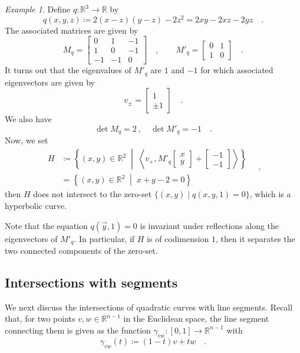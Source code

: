 \documentclass[pdftex,a4paper,12pt]{scrartcl}
\theoremstyle{plain}
\theoremstyle{definition}
\theoremstyle{remark}
\newtheorem{example}[theorem]{Example}
\numberwithin{equation}{section}
\begin{document}
\begin{example}
Define $q:\mathbb R^3\to\mathbb R$ by
\[
q(x,y,z)
\coloneqq 2(x-z)(y-z) - 2z^2 = 2xy - 2xz - 2yz
\quad.
\]
The associated matrices are given by
\[
M_q =
\begin{bmatrix}
0 & 1 & -1 \\
1 & 0 & -1 \\
-1 & -1 & 0
\end{bmatrix}
\quad,\qquad
M'_q =
\begin{bmatrix}
0 & 1 \\ 1 & 0
\end{bmatrix}
\quad.
\]
It turns out that the eigenvalues of $M'_q$ are $1$ and $-1$ for which associated eigenvectors are given by
\[
v_\pm =
\begin{bmatrix}
1 \\ \pm 1
\end{bmatrix}
\quad.
\]
We also have
\[
\det M_q = 2
\ ,\quad
\det M'_q = -1
\quad.
\]
Now, we set
\[
\begin{split}
H
&\coloneqq\left\{
(x,y)\in\mathbb R^2
\;\middle|\;
\left\langle v_+,M'_q\begin{bmatrix} x \\ y \end{bmatrix} + \begin{bmatrix} -1 \\ -1 \end{bmatrix}\right\rangle
\right\}
\\
&= \left\{
(x,y)\in\mathbb R^2
\;\middle|\;
x+y-2 = 0
\right\}
\end{split}
\quad,
\]
then $H$ does not intersect to the zero-set $\{(x,y)\mid q(x,y,1)=0\}$, which is a hyperbolic curve.
\end{example}

Note that the equation $q(\vec y,1)=0$ is invariant under reflections along the eigenvectors of $M'_q$.
In particular, if $H$ is of codimension $1$, then it separates the two connected components of the zero-set.

\subsection{Intersections with segments}

We next discuss the intersections of quadratic curves with line segments.
Recall that, for two points $v,w\in\mathbb R^{n-1}$ in the Euclidean space, the line segment connecting them is given as the function $\gamma_{vw}:[0,1]\to\mathbb R^{n-1}$ with
\[
\gamma_{vw}(t)\coloneqq (1-t)v + tw
\quad.
\]
\end{document}
